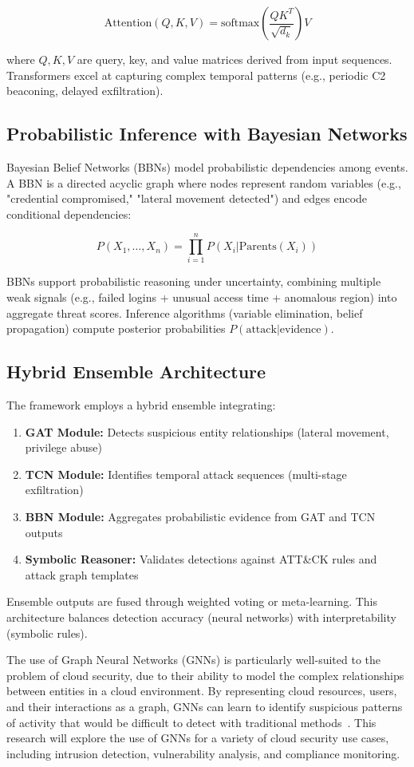 $$\text{Attention}(Q, K, V) = \text{softmax}\left(\frac{QK^T}{\sqrt{d_k}}\right)V$$

where $Q, K, V$ are query, key, and value matrices derived from input sequences. Transformers excel at capturing complex temporal patterns (e.g., periodic C2 beaconing, delayed exfiltration).

\subsection{Probabilistic Inference with Bayesian Networks}
Bayesian Belief Networks (BBNs) model probabilistic dependencies among events. A BBN is a directed acyclic graph where nodes represent random variables (e.g., "credential compromised," "lateral movement detected") and edges encode conditional dependencies:

$$P(X_1, \ldots, X_n) = \prod_{i=1}^{n} P(X_i | \text{Parents}(X_i))$$

BBNs support probabilistic reasoning under uncertainty, combining multiple weak signals (e.g., failed logins + unusual access time + anomalous region) into aggregate threat scores. Inference algorithms (variable elimination, belief propagation) compute posterior probabilities $P(\text{attack} | \text{evidence})$.

\subsection{Hybrid Ensemble Architecture}
The framework employs a hybrid ensemble integrating:
\begin{enumerate}
    \item \textbf{GAT Module:} Detects suspicious entity relationships (lateral movement, privilege abuse)
    \item \textbf{TCN Module:} Identifies temporal attack sequences (multi-stage exfiltration)
    \item \textbf{BBN Module:} Aggregates probabilistic evidence from GAT and TCN outputs
    \item \textbf{Symbolic Reasoner:} Validates detections against ATT\&CK rules and attack graph templates
\end{enumerate}

Ensemble outputs are fused through weighted voting or meta-learning. This architecture balances detection accuracy (neural networks) with interpretability (symbolic rules).

The use of Graph Neural Networks (GNNs) is particularly well-suited to the problem of cloud security, due to their ability to model the complex relationships between entities in a cloud environment. By representing cloud resources, users, and their interactions as a graph, GNNs can learn to identify suspicious patterns of activity that would be difficult to detect with traditional methods~\cite{rademics2024gnn}. This research will explore the use of GNNs for a variety of cloud security use cases, including intrusion detection, vulnerability analysis, and compliance monitoring.

